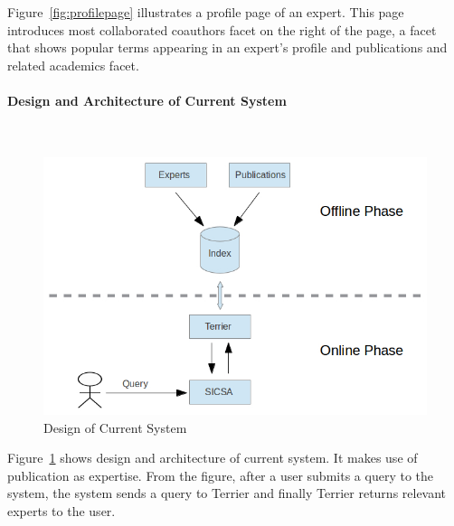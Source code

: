 Figure~\ref{fig:profilepage} illustrates a profile page of an expert. This page introduces most collaborated coauthors facet on the right of the page, a 
facet that shows popular terms appearing in an expert's profile and publications and related academics facet.

\paragraph{Design and Architecture of Current System} \hspace{0pt} \\

 \begin{figure}
 \centering
 \includegraphics[scale=0.5,keepaspectratio]{./figures/currentSystemDesign.jpg}
 \caption{Design of Current System} \label{fig:currentDesign} 
\end{figure}
Figure~\ref{fig:currentDesign} shows design and architecture of current system. It makes use of publication as expertise. From the figure, after a user submits a query
to the system, the system sends a query to Terrier and finally Terrier returns relevant experts to the user.

